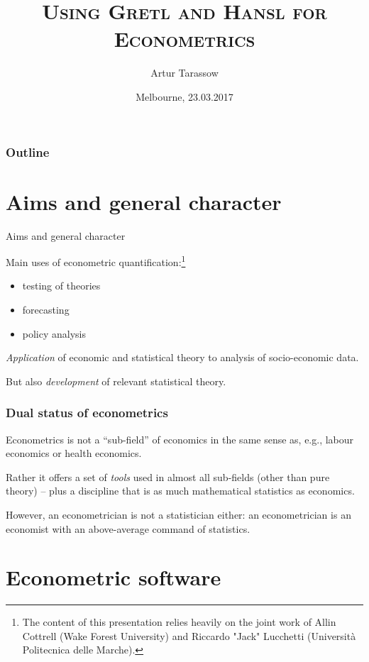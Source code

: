 \documentclass{beamer}[11pt]
\title{\textsc{Using Gretl and Hansl for Econometrics}}
\subtitle{}
\author[Tarassow] %
{Artur Tarassow\inst{1}\\
	\textsc{\small }
	}
\institute[] %
{
  \inst{1}%
  Faculty of Economics and Social Sciences\\
  University of Hamburg
}
\date[] %
{Melbourne, 23.03.2017}
\begin{document}
\begin{frame}
  \titlepage
\end{frame}


\begin{frame}
  \frametitle{Outline}
  \tableofcontents%
\end{frame}


\section{Aims and general character}


\begin{frame}{Aims and general character}
	
	Main uses of econometric quantification:\footnote{The content of this presentation relies heavily on the joint work of Allin Cottrell (Wake Forest University) and Riccardo "Jack" Lucchetti (Università Politecnica delle Marche).}
	
	\begin{itemize}
		\item testing of theories
		\item forecasting
		\item policy analysis
	\end{itemize}
	
	\medskip
	
	\emph{Application} of economic and statistical theory to analysis of
	socio-economic data.
	
	\medskip
	
	But also \emph{development} of relevant statistical theory.
\end{frame}

\begin{frame}
	\frametitle{Dual status of econometrics}
	
	Econometrics is not a ``sub-field'' of economics in the same sense as, e.g., labour economics or health economics. 
	
	\medskip
	
	Rather it offers a set of \emph{tools} used in almost all sub-fields
	(other than pure theory) -- plus a discipline that is as much
	mathematical statistics as economics.
	
	\medskip
	
	However, an econometrician is not a statistician either: an
	econometrician is an economist with an above-average command of
	statistics.
\end{frame}


\section{Econometric software}
\end{document}
